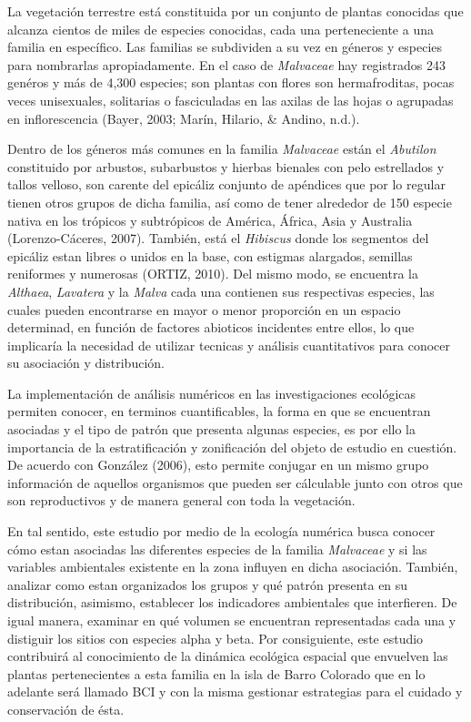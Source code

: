 \documentclass[11pt,]{article}
\begin{document}
La vegetación terrestre está constituida por un conjunto de plantas
conocidas que alcanza cientos de miles de especies conocidas, cada una
perteneciente a una familia en específico. Las familias se subdividen a
su vez en géneros y especies para nombrarlas apropiadamente. En el caso
de \emph{Malvaceae} hay registrados 243 genéros y más de 4,300 especies;
son plantas con flores son hermafroditas, pocas veces unisexuales,
solitarias o fasciculadas en las axilas de las hojas o agrupadas en
inflorescencia (Bayer, 2003; Marín, Hilario, \& Andino, n.d.).

Dentro de los géneros más comunes en la familia \emph{Malvaceae} están
el \emph{Abutilon} constituido por arbustos, subarbustos y hierbas
bienales con pelo estrellados y tallos velloso, son carente del epicáliz
conjunto de apéndices que por lo regular tienen otros grupos de dicha
familia, así como de tener alrededor de 150 especie nativa en los
trópicos y subtrópicos de América, África, Asia y Australia
(Lorenzo-Cáceres, 2007). También, está el \emph{Hibiscus} donde los
segmentos del epicáliz estan libres o unidos en la base, con estigmas
alargados, semillas reniformes y numerosas (ORTIZ, 2010). Del mismo
modo, se encuentra la \emph{Althaea}, \emph{Lavatera} y la \emph{Malva}
cada una contienen sus respectivas especies, las cuales pueden
encontrarse en mayor o menor proporción en un espacio determinad, en
función de factores abioticos incidentes entre ellos, lo que implicaría
la necesidad de utilizar tecnicas y análisis cuantitativos para conocer
su asociación y distribución.

La implementación de análisis numéricos en las investigaciones
ecológicas permiten conocer, en terminos cuantificables, la forma en que
se encuentran asociadas y el tipo de patrón que presenta algunas
especies, es por ello la importancia de la estratificación y
zonificación del objeto de estudio en cuestión. De acuerdo con González
(2006), esto permite conjugar en un mismo grupo información de aquellos
organismos que pueden ser cálculable junto con otros que son
reproductivos y de manera general con toda la vegetación.

En tal sentido, este estudio por medio de la ecología numérica busca
conocer cómo estan asociadas las diferentes especies de la familia
\emph{Malvaceae} y si las variables ambientales existente en la zona
influyen en dicha asociación. También, analizar como estan organizados
los grupos y qué patrón presenta en su distribución, asimismo,
establecer los indicadores ambientales que interfieren. De igual manera,
examinar en qué volumen se encuentran representadas cada una y distiguir
los sitios con especies alpha y beta. Por consiguiente, este estudio
contribuirá al conocimiento de la dinámica ecológica espacial que
envuelven las plantas pertenecientes a esta familia en la isla de Barro
Colorado que en lo adelante será llamado BCI y con la misma gestionar
estrategias para el cuidado y conservación de ésta.
\end{document}
